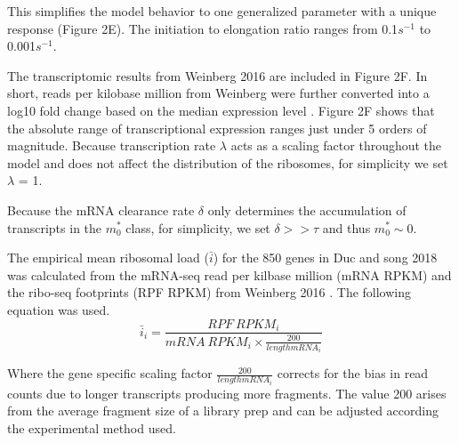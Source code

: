 \documentclass[a4,center,fleqn]{NAR}
\newcommand{\MRL}{\ensuremath{\bar{i}}\xspace}
\begin{document}
This simplifies the model behavior to one generalized parameter with a unique response (Figure 2E).  The initiation to elongation ratio ranges from 0.1$s^{-1}$ to 0.001$s^{-1}$.

The transcriptomic results from Weinberg 2016 are included in Figure 2F. In short, reads per kilobase million from Weinberg were further converted into a log10 fold change based on the median expression level \citep{RN29}. Figure 2F shows that the absolute range of transcriptional expression ranges just under 5 orders of magnitude. Because transcription rate $\lambda$ acts as a scaling factor throughout the model and does not affect the distribution of the ribosomes, for simplicity we set $\lambda$ = 1.

Because the mRNA clearance rate $\delta$ only determines the accumulation of transcripts in the  $m_0^*$  class, for simplicity, we set $\delta >> \tau$ and thus  $m_0^* \sim 0$.
 
The empirical mean ribosomal load (\MRL) for the 850 genes in Duc and song 2018 was calculated from the mRNA-seq read per kilbase million (mRNA RPKM) and the ribo-seq footprints (RPF RPKM) from Weinberg 2016 \citep{RN29}. The following equation was used.
\begin{equation}\label{eq:MRL}
	\MRL_i = \frac{RPF\: RPKM_i}{mRNA\: RPKM_i \times \frac{200}{length mRNA_i}}
\end{equation}

Where the gene specific scaling factor $\frac{200}{length mRNA_i}$ corrects for the bias in read counts due to longer transcripts producing more fragments. The value 200 arises from the average fragment size of a library prep and can be adjusted according the experimental method used.
\end{document}
